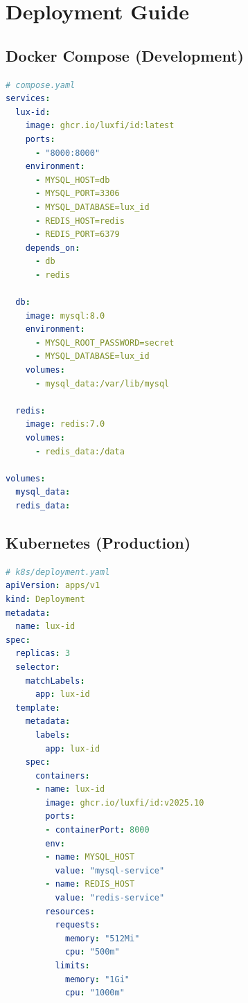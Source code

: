 \section{Deployment Guide}


\subsection{Docker Compose (Development)}

\begin{lstlisting}[language=yaml]
# compose.yaml
services:
  lux-id:
    image: ghcr.io/luxfi/id:latest
    ports:
      - "8000:8000"
    environment:
      - MYSQL_HOST=db
      - MYSQL_PORT=3306
      - MYSQL_DATABASE=lux_id
      - REDIS_HOST=redis
      - REDIS_PORT=6379
    depends_on:
      - db
      - redis

  db:
    image: mysql:8.0
    environment:
      - MYSQL_ROOT_PASSWORD=secret
      - MYSQL_DATABASE=lux_id
    volumes:
      - mysql_data:/var/lib/mysql

  redis:
    image: redis:7.0
    volumes:
      - redis_data:/data

volumes:
  mysql_data:
  redis_data:
\end{lstlisting}

\subsection{Kubernetes (Production)}

\begin{lstlisting}[language=yaml]
# k8s/deployment.yaml
apiVersion: apps/v1
kind: Deployment
metadata:
  name: lux-id
spec:
  replicas: 3
  selector:
    matchLabels:
      app: lux-id
  template:
    metadata:
      labels:
        app: lux-id
    spec:
      containers:
      - name: lux-id
        image: ghcr.io/luxfi/id:v2025.10
        ports:
        - containerPort: 8000
        env:
        - name: MYSQL_HOST
          value: "mysql-service"
        - name: REDIS_HOST
          value: "redis-service"
        resources:
          requests:
            memory: "512Mi"
            cpu: "500m"
          limits:
            memory: "1Gi"
            cpu: "1000m"
\end{lstlisting}


